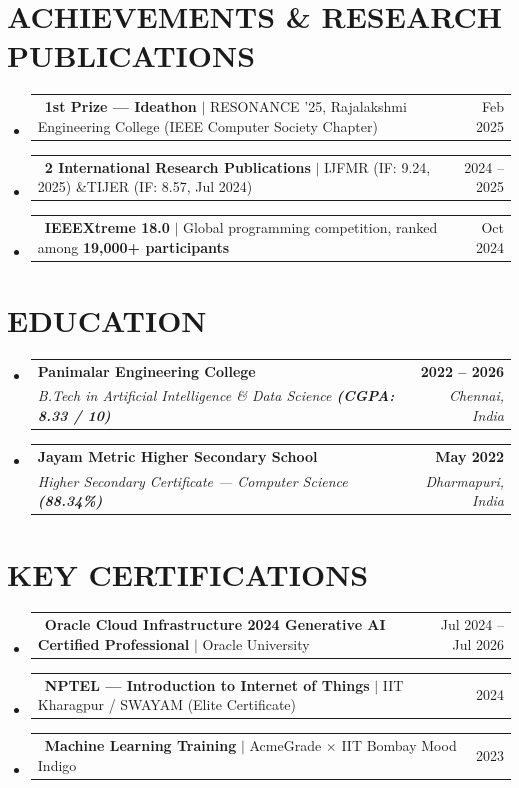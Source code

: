 \documentclass[letterpaper,10pt]{article}
\makeatletter
\newcommand{\resumeSubheading}[4]{
  \vspace{1.5pt}\item
    \begin{tabular*}{0.98\textwidth}[t]{l@{\extracolsep{\fill}}r}
      \textbf{\color{darkgray}#1} & \textbf{\small #2} \\
      \textit{\small\color{accentblue}#3} & \textit{\small #4} \\
    \end{tabular*}\vspace{0.5pt}
}
\newcommand{\resumeProjectHeading}[2]{
  \vspace{1.5pt}\item
    \begin{tabular*}{0.98\textwidth}{l@{\extracolsep{\fill}}r}
      \small#1 & \small#2 \\
    \end{tabular*}\vspace{0.5pt}
}
\newcommand{\resumeSubHeadingListStart}{\begin{itemize}[leftmargin=0.12in, label={}]}
\newcommand{\resumeSubHeadingListEnd}{\end{itemize}\vspace{1.5pt}}
\makeatother
\begin{document}
\section{ACHIEVEMENTS \& RESEARCH PUBLICATIONS}
\resumeSubHeadingListStart
  \resumeProjectHeading
    {\faIcon{trophy}\ \textbf{1st Prize --- Ideathon} $|$ \small RESONANCE '25, Rajalakshmi Engineering College (IEEE Computer Society Chapter)}{Feb 2025}
  \resumeProjectHeading
    {\faIcon{file-alt}\ \textbf{2 International Research Publications} $|$ \small IJFMR (IF: 9.24, 2025) \enspace\&\enspace TIJER (IF: 8.57, Jul 2024)}{2024 -- 2025}
  \resumeProjectHeading
    {\faIcon{laptop-code}\ \textbf{IEEEXtreme 18.0} $|$ \small Global programming competition, ranked among \textbf{19,000+ participants}}{Oct 2024}
\resumeSubHeadingListEnd

\section{EDUCATION}
\resumeSubHeadingListStart
  \resumeSubheading{Panimalar Engineering College}{2022 -- 2026}{B.Tech in Artificial Intelligence \& Data Science \textbf{(CGPA: 8.33 / 10)}}{Chennai, India}
  \resumeSubheading{Jayam Metric Higher Secondary School}{May 2022}{Higher Secondary Certificate --- Computer Science \textbf{(88.34\%)}}{Dharmapuri, India}
\resumeSubHeadingListEnd

\section{KEY CERTIFICATIONS}
\resumeSubHeadingListStart
  \resumeProjectHeading
    {\faIcon{certificate}\ \textbf{Oracle Cloud Infrastructure 2024 Generative AI Certified Professional} $|$ \small Oracle University}{Jul 2024 -- Jul 2026}
  \resumeProjectHeading
    {\faIcon{certificate}\ \textbf{NPTEL --- Introduction to Internet of Things} $|$ \small IIT Kharagpur / SWAYAM (Elite Certificate)}{2024}
  \resumeProjectHeading
    {\faIcon{certificate}\ \textbf{Machine Learning Training} $|$ \small AcmeGrade $\times$ IIT Bombay Mood Indigo}{2023}
\resumeSubHeadingListEnd

\end{document}
